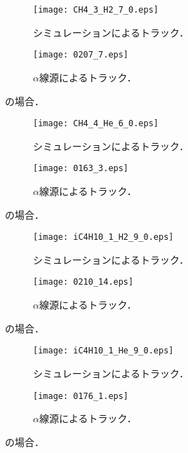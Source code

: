 \documentclass[../master]{subfiles}
\begin{document}
\begin{figure}[h]
  \centering
  \begin{subfigure}{0.48\columnwidth}
    \centering
    \texttt{[image: CH4\_3\_H2\_7\_0.eps]}
    \caption{シミュレーションによるトラック．}
  \end{subfigure}
  \begin{subfigure}{0.48\columnwidth}
    \centering
    \texttt{[image: 0207\_7.eps]}
    \caption{$\alpha$線源によるトラック．}
  \end{subfigure}
  \caption{\MethaneHydro の場合．}
  \label{fig::track_comp_ch4_h2}
\end{figure}
\begin{figure}[h]
  \centering
  \begin{subfigure}{0.48\columnwidth}
    \centering
    \texttt{[image: CH4\_4\_He\_6\_0.eps]}
    \caption{シミュレーションによるトラック．}
  \end{subfigure}
  \begin{subfigure}{0.48\columnwidth}
    \centering
    \texttt{[image: 0163\_3.eps]}
    \caption{$\alpha$線源によるトラック．}
  \end{subfigure}
  \caption{\MethaneHerium の場合．}
  \label{fig::track_comp_ch4_he}
\end{figure}
\begin{figure}[h]
  \centering
  \begin{subfigure}{0.48\columnwidth}
    \centering
    \texttt{[image: iC4H10\_1\_H2\_9\_0.eps]}
    \caption{シミュレーションによるトラック．}
  \end{subfigure}
  \begin{subfigure}{0.48\columnwidth}
    \centering
    \texttt{[image: 0210\_14.eps]}
    \caption{$\alpha$線源によるトラック．}
  \end{subfigure}
  \caption{\isoButaneHydro の場合．}
  \label{fig::track_comp_ic4h10_h2}
\end{figure}
\begin{figure}[h]
  \centering
  \begin{subfigure}{0.48\columnwidth}
    \centering
    \texttt{[image: iC4H10\_1\_He\_9\_0.eps]}
    \caption{シミュレーションによるトラック．}
  \end{subfigure}
  \begin{subfigure}{0.48\columnwidth}
    \centering
    \texttt{[image: 0176\_1.eps]}
    \caption{$\alpha$線源によるトラック．}
  \end{subfigure}
  \caption{\isoButaneHerium の場合．}
  \label{fig::track_comp_ic4h10_he}
\end{figure}
\end{document}
